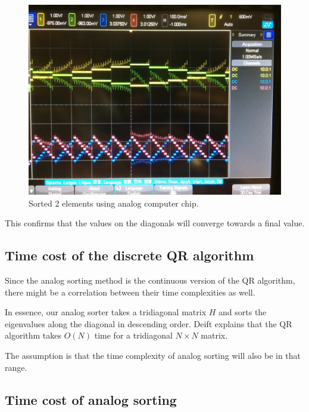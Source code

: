 \begin{figure}[h]
\centering
\includegraphics[width=\columnwidth]{graphics/2d_analog.jpg}
\caption{Sorted 2 elements using analog computer chip.}
\end{figure}

This confirms that the values on the diagonals will converge towards a final value.


\subsection{Time cost of the discrete QR algorithm}
Since the analog sorting method is the continuous version of the QR algorithm, there might be a correlation between their time complexities as well. 

In essence, our analog sorter takes a tridiagonal matrix $H$ and sorts the eigenvalues along the diagonal in descending order. Deift explains that the QR algorithm takes $O(N)$ time for a tridiagonal $N\times N$ matrix. 

The assumption is that the time complexity of analog sorting will also be in that range.


\subsection{Time cost of analog sorting}

